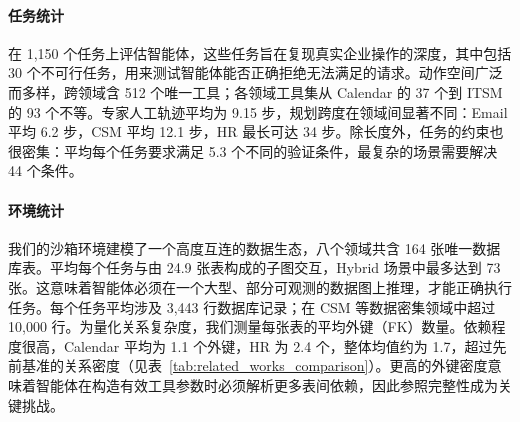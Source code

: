 \paragraph{任务统计}
\dataset 在 1,150 个任务上评估智能体，这些任务旨在复现真实企业操作的深度，其中包括 30 个不可行任务，用来测试智能体能否正确拒绝无法满足的请求。动作空间广泛而多样，跨领域含 512 个唯一工具；各领域工具集从 Calendar 的 37 个到 ITSM 的 93 个不等。专家人工轨迹平均为 9.15 步，规划跨度在领域间显著不同：Email 平均 6.2 步，CSM 平均 12.1 步，HR 最长可达 34 步。除长度外，任务的约束也很密集：平均每个任务要求满足 5.3 个不同的验证条件，最复杂的场景需要解决 44 个条件。

\paragraph{环境统计}
我们的沙箱环境建模了一个高度互连的数据生态，八个领域共含 164 张唯一数据库表。平均每个任务与由 24.9 张表构成的子图交互，Hybrid 场景中最多达到 73 张。这意味着智能体必须在一个大型、部分可观测的数据图上推理，才能正确执行任务。每个任务平均涉及 3,443 行数据库记录；在 CSM 等数据密集领域中超过 10,000 行。为量化关系复杂度，我们测量每张表的平均外键（FK）数量。依赖程度很高，Calendar 平均为 1.1 个外键，HR 为 2.4 个，整体均值约为 1.7，超过先前基准的关系密度（见表~\ref{tab:related_works_comparison}）。更高的外键密度意味着智能体在构造有效工具参数时必须解析更多表间依赖，因此参照完整性成为关键挑战。
